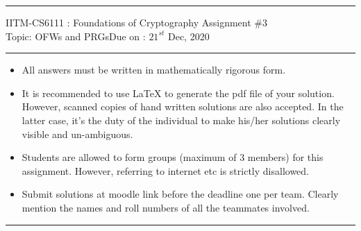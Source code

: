 \documentclass[11pt]{exam}
\begin{document}

\hrule
\vspace{3mm}
\noindent
{\sf IITM-CS6111 : Foundations of Cryptography  \hfill Assignment \#3 }
\vspace{3mm} \\
\noindent
{\sf Topic: OFWs and PRGs\hfill Due on : $21^{st}$ Dec, 2020}
\vspace{3mm}
\hrule

{\small 
\begin{itemize}
\itemsep 0pt
\item All answers must be written in mathematically rigorous form.
\item It is recommended to use LaTeX to generate the pdf file of your solution. However, scanned copies of hand written solutions are also accepted. In the latter case, it's the duty of the individual to make his/her solutions clearly visible and un-ambiguous.
\item Students are allowed to form groups (maximum of $3$ members) for this assignment. However, referring to internet etc is strictly disallowed.
\item Submit solutions at moodle link before the deadline one per team. Clearly mention the names and roll numbers of all the teammates involved.
\end{itemize}
}

\hrule
\end{document}
